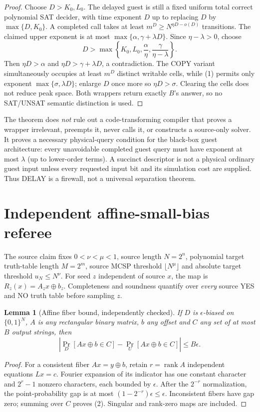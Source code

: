 \documentclass[11pt]{article}
\newtheorem{lemma}{Lemma}
\begin{document}
\begin{proof}
Choose $D>K_0,L_0$.  The delayed guest is still a fixed uniform total correct
polynomial SAT decider, with time exponent $D$ up to replacing $D$ by
$\max\{D,K_0\}$.  A completed call takes at least
$m^D\ge N^{\eta D-o(D)}$ transitions.  The claimed upper exponent is at most
$\max\{\alpha,\gamma+\lambda D\}$.  Since $\eta-\lambda>0$, choose
\[
 D>\max\left\{K_0,L_0,\frac{\alpha}{\eta},
                         \frac{\gamma}{\eta-\lambda}\right\}.
\]
Then $\eta D>\alpha$ and $\eta D>\gamma+\lambda D$, a contradiction.
The COPY variant simultaneously occupies at least $m^D$ distinct writable
cells, while (1) permits only exponent $\max\{\sigma,\lambda D\}$; enlarge $D$
once more so $\eta D>\sigma$.  Clearing the cells does not reduce peak space.
Both wrappers return exactly $B$'s answer, so no SAT/UNSAT semantic distinction
is used.\qedhere
\end{proof}

The theorem does \emph{not} rule out a code-transforming compiler that proves a
wrapper irrelevant, preempts it, never calls it, or constructs a source-only
solver.  It proves a necessary physical-query condition for the black-box guest
architecture: every unavoidable completed guest query must have exponent at most
$\lambda$ (up to lower-order terms).  A succinct descriptor is not a physical
ordinary guest input unless every requested input bit and its simulation cost are
supplied.  Thus DELAY is a firewall, not a universal separation theorem.

\section{Independent affine-small-bias referee}
The source claim fixes $0<\nu<\mu<1$, source length $N=2^n$, polynomial target
truth-table length $M=2^m$, source MCSP threshold $\lfloor N^\mu\rfloor$ and
absolute target threshold $u_N\le N^\nu$.  For seed $z$ independent of source
$x$, the map is $R_z(x)=A_zx\oplus b_z$.  Completeness and soundness quantify
over \emph{every} source YES and NO truth table before sampling $z$.

\begin{lemma}[Affine fiber bound, independently checked]
If $D$ is $\epsilon$-biased on $\{0,1\}^N$, $A$ is any rectangular binary
matrix, $b$ any offset and $C$ any set of at most $B$ output strings, then
\[
 \left|\Pr_D[Ax\oplus b\in C]-\Pr_U[Ax\oplus b\in C]\right|
 \le B\epsilon .                                                   \tag{2}
\]
\end{lemma}
\begin{proof}
For a consistent fiber $Ax=y\oplus b$, retain $r=\operatorname{rank}A$
independent equations $Lx=c$.  Fourier expansion of its indicator has one
constant character and $2^r-1$ nonzero characters, each bounded by $\epsilon$.
After the $2^{-r}$ normalization, the point-probability gap is at most
$(1-2^{-r})\epsilon\le\epsilon$.  Inconsistent fibers have gap zero; summing
over $C$ proves (2).  Singular and rank-zero maps are included.
\end{proof}
\end{document}
